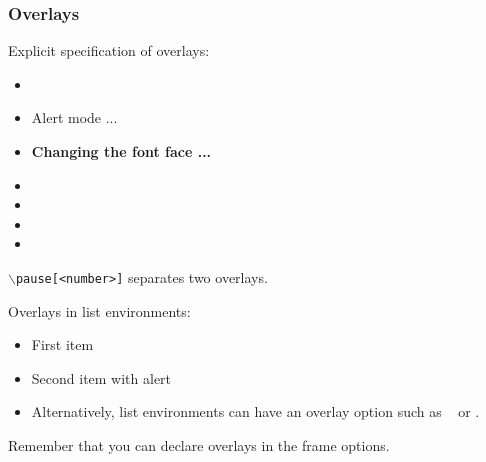 \begin{frame}
  \frametitle{Overlays}
  {\small 

    Explicit specification of overlays:
    \begin{itemize}
    \item {}
    \item \alert<3>{Alert mode ...} 
    \item \textbf<4>{Changing the font face ...}
    \item {} 
    \item {}
    \item {}
    \item {}
    \end{itemize}

    \vfill
    {\tt $\backslash$pause[<number>]} separates two overlays.

    \vfill
    Overlays in list environments:
    \begin{itemize}
    \item<9-> First item
    \item<alert@10> Second item with alert
    \item Alternatively, list environments can have an overlay option such as {\tt <+-> } or {\tt <+- alert@ +>}.
    \end{itemize}

    \vfill
    Remember that you can declare overlays in the frame options.
    \hyperlink{frameoptions}{}

  }
\end{frame}



